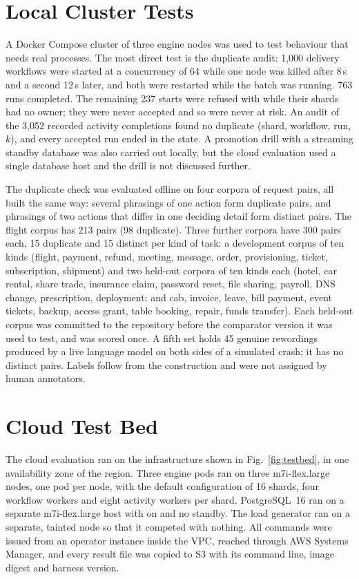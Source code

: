 \section{Local Cluster Tests}

A Docker Compose cluster of three engine nodes was used to test behaviour
that needs real processes. The most direct test is the duplicate audit: 1,000
delivery workflows were started at a concurrency of 64 while one node was
killed after 8\,s and a second 12\,s later, and both were restarted while the
batch was running. 763 runs completed. The remaining 237 starts were refused
with  while their shards had no owner; they were never accepted
and so were never at risk. An audit of the 3,052 recorded activity completions
found no duplicate (shard, workflow, run, $k$), and every accepted run ended in
the  state. A promotion drill with a streaming standby database
was also carried out locally, but the cloud evaluation used a single database
host and the drill is not discussed further.

The duplicate check was evaluated offline on four corpora of request pairs,
all built the same way: several phrasings of one action form duplicate
pairs, and phrasings of two actions that differ in one deciding detail form
distinct pairs. The flight corpus has 213 pairs (98 duplicate). Three
further corpora have 300 pairs each, 15 duplicate and 15 distinct per kind
of task: a development corpus of ten kinds (flight, payment, refund,
meeting, message, order, provisioning, ticket, subscription, shipment) and
two held-out corpora of ten kinds each (hotel, car rental, share trade,
insurance claim, password reset, file sharing, payroll, DNS change,
prescription, deployment; and cab, invoice, leave, bill payment, event
tickets, backup, access grant, table booking, repair, funds transfer). Each
held-out corpus was committed to the repository before the comparator
version it was used to test, and was scored once. A fifth set holds 45
genuine rewordings produced by a live language model on both sides of a
simulated crash; it has no distinct pairs. Labels follow from the
construction and were not assigned by human annotators.

\section{Cloud Test Bed}

The cloud evaluation ran on the infrastructure shown in
Fig.~\ref{fig:testbed}, in one availability zone of the  region.
Three engine pods ran on three m7i-flex.large nodes, one pod per node, with
the default configuration of 16 shards, four workflow workers and eight
activity workers per shard. PostgreSQL~16 ran on a separate m7i-flex.large
host with  on and no standby. The load generator ran
on a separate, tainted node so that it competed with nothing. All commands
were issued from an operator instance inside the VPC, reached through AWS
Systems Manager, and every result file was copied to S3 with its command line,
image digest and harness version.

